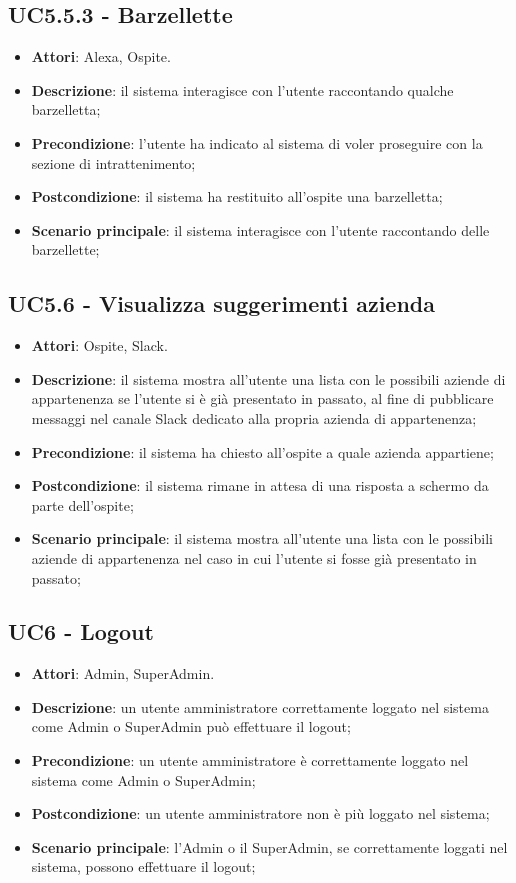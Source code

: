 \documentclass[../AnalisiDeiRequisiti_v3.0.0.tex]{subfiles}
\begin{document}
\subsection{UC5.5.3 - Barzellette} 
\label{sssec:UC5.5.3} 
\begin{itemize} 
\item \textbf{Attori}: Alexa, Ospite.
\item \textbf{Descrizione}: il sistema interagisce con l'utente raccontando qualche barzelletta;
\item \textbf{Precondizione}: l'utente ha indicato al sistema di voler proseguire con la sezione di intrattenimento;
\item \textbf{Postcondizione}: il sistema ha restituito all'ospite una barzelletta;
\item \textbf{Scenario principale}: il sistema interagisce con l'utente raccontando delle barzellette;
\end{itemize} 
\subsection{UC5.6 - Visualizza suggerimenti azienda} 
\label{sssec:UC5.6} 
\begin{itemize} 
\item \textbf{Attori}: Ospite, Slack.
\item \textbf{Descrizione}: il sistema mostra all'utente una lista con le possibili aziende di appartenenza se l'utente si è già presentato in passato, al fine di pubblicare messaggi nel canale Slack dedicato alla propria azienda di appartenenza;
\item \textbf{Precondizione}: il sistema ha chiesto all'ospite a quale azienda appartiene;
\item \textbf{Postcondizione}: il sistema rimane in attesa di una risposta a schermo da parte dell'ospite;
\item \textbf{Scenario principale}: il sistema mostra all'utente una lista con le possibili aziende di appartenenza nel caso in cui l'utente si fosse già presentato in passato;
\end{itemize} 
\subsection{UC6 - Logout} 
\label{sssec:UC6} 
\begin{itemize} 
\item \textbf{Attori}: Admin, SuperAdmin.
\item \textbf{Descrizione}: un utente amministratore correttamente loggato nel sistema come Admin o SuperAdmin può effettuare il logout;
\item \textbf{Precondizione}: un utente amministratore è correttamente loggato nel sistema come Admin o SuperAdmin;
\item \textbf{Postcondizione}: un utente amministratore non è più loggato nel sistema;
\item \textbf{Scenario principale}: l'Admin o il SuperAdmin, se correttamente loggati nel sistema, possono effettuare il logout;
\end{itemize} 
\newpage
\end{document}
